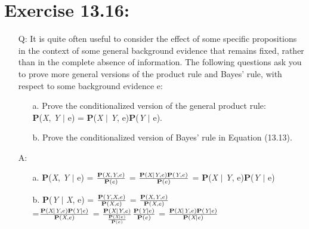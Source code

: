 \documentclass{article}
\begin{document}
\section{Exercise 13.16:}
\begin{itemize}
\item[Q:]It is quite often useful to consider the effect of some specific propositions in the context of some general background evidence that remains fixed, rather than in the complete absence of information. The following questions ask you to prove more general versions of the product rule and Bayes' rule, with respect to some background evidence e:
\begin{itemize}
\item[a.]Prove the conditionalized version of the general product rule:\\\textbf P(\textit X, \textit Y $\vert$ e) = \textbf P(\textit X $\vert$ \textit Y, e)\textbf P(\textit Y $\vert$ e).
\item[b.]Prove the conditionalized version of Bayes' rule in Equation (13.13).
\end{itemize}
\item[A:]
\begin{itemize}
\item[a.]\textbf P(\textit X, \textit Y $\vert$ e) = $\frac{\textbf P(\textit X, \textit Y, e)}{\textbf P(e)}$ = $\frac{\textbf P(\textit X \vert \textit Y, e) \textbf P(\textit Y, e)}{\textbf P(e)}$ = \textbf P(\textit X $\vert$ \textit Y, e)\textbf P(\textit Y $\vert$ e)
\item[b.]\textbf P(\textit Y $\vert$ \textit X, e) = $\frac{\textbf P(\textit Y, \textit X, e)}{\textbf P(\textit X, e)}$ = $\frac{\textbf P(\textit X, \textit Y, e)}{\textbf P(\textit X, e)}$\\=$\frac{\textbf P(\textit X \vert \textit Y, e)\textbf P(\textit Y \vert e)}{\textbf P(\textit X, e)}$ = $\frac{\textbf P(\textit X \vert \textit Y, e)}{\frac{\textbf P(\textit X \vert e)}{\textbf P(e)}}$$\frac{\textbf P(\textit Y \vert e)}{\textbf P(e)}$ = $\frac{\textbf P(\textit X \vert \textit Y, e)\textbf P(\textit Y \vert e)}{\textbf P(\textit X \vert e)}$
\end{itemize}
\end{itemize}
\end{document}
